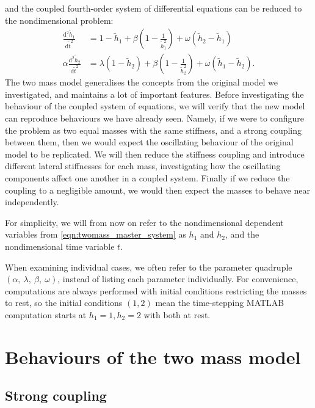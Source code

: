 \documentclass{report}
\begin{document}
and the coupled fourth-order system of differential equations can be reduced to the nondimensional problem:
\begin{equation}
    \begin{aligned}
        \frac{\mathrm{d}^2 \tilde{h}_1}{\mathrm{d}\tilde{t}^2} &= 1 - \tilde{h}_1 + \beta \left( 1 - \frac{1}{\tilde{h}_1^2} \right) + \omega(\tilde{h}_2-\tilde{h}_1) \\
        \alpha\frac{\mathrm{d}^2 \tilde{h}_2}{\mathrm{d}\tilde{t}^2} &= \lambda(1 - \tilde{h}_2) + \beta \left( 1 - \frac{1}{\tilde{h}_2^2} \right) + \omega(\tilde{h}_1-\tilde{h}_2).
    \end{aligned}
    \label{eqn:twomass_master_system}
\end{equation}
The two mass model generalises the concepts from the original model we investigated,
and maintains a lot of important features.
Before investigating the behaviour of the coupled system of equations,
we will verify that the new model can reproduce behaviours we have already seen.
Namely, if we were to configure the problem as two equal masses with the same stiffness,
and a strong coupling between them,
then we would expect the oscillating behaviour of the original model to be replicated.
We will then reduce the stiffness coupling and introduce different lateral stiffnesses for each mass,
investigating how the oscillating components affect one another in a coupled system.
Finally if we reduce the coupling to a negligible amount,
we would then expect the masses to behave near independently.

For simplicity, we will from now on refer to the nondimensional dependent variables from \ref{eqn:twomass_master_system} as \(h_1\) and \(h_2\),
and the nondimensional time variable $t$.

When examining individual cases, we often refer to the parameter quadruple \((\alpha,~\lambda,~\beta,~\omega)\), instead of listing each parameter individually.
For convenience, computations are always performed with initial conditions restricting the masses to rest,
so the initial conditions \((1,2)\) mean the time-stepping MATLAB computation starts at $h_1=1,h_2=2$ with both at rest.

\section{Behaviours of the two mass model}

\subsection{Strong coupling}
\end{document}
